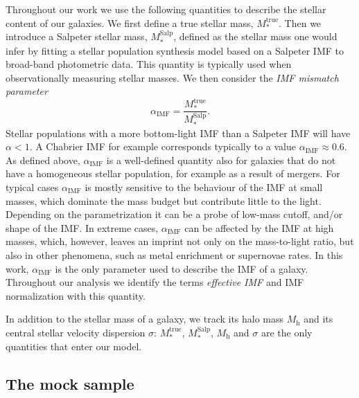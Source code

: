 \documentclass[usenatbib]{mnras}
\def\mhalo{M_{\mathrm{h}}}
\def\mtrue{M_*^{\mathrm{true}}}
\def\msalp{M_*^{\mathrm{Salp}}}
\def\aimf{\alpha_{\mathrm{IMF}}}
\begin{document}
Throughout our work we use the following quantities to describe the
stellar content of our galaxies. We first define a true stellar mass,
$\mtrue$. Then we introduce a Salpeter \citep{Sal55} stellar
mass, $\msalp$, defined as the stellar mass one would infer by fitting
a stellar population synthesis model based on a Salpeter IMF to
broad-band photometric data. This quantity is typically used when
observationally measuring stellar masses.  We then consider the {\em
  IMF mismatch parameter} \citep{Tre++10}
\begin{equation}\label{eq:aimf}
\aimf = \frac{\mtrue}{\msalp}.
\end{equation}
Stellar populations with a more bottom-light IMF than a Salpeter IMF
will have $\alpha<1$. A Chabrier IMF for example corresponds typically
to a value $\aimf\approx0.6$.  As defined above, $\aimf$ is a
well-defined quantity also for galaxies that do not have a homogeneous
stellar population, for example as a result of mergers.  For typical
cases $\aimf$ is mostly sensitive to the behaviour of the IMF at small
masses, which dominate the mass budget but contribute little to
  the light. Depending on the parametrization it can be a probe of
low-mass cutoff, and/or shape of the IMF. In
  extreme cases, $\aimf$ can be affected by the IMF at high masses,
  which, however, leaves an imprint not only on the mass-to-light
  ratio, but also in other phenomena, such as metal enrichment or
  supernovae rates. In this work, $\aimf$ is the only parameter used
to describe the IMF of a galaxy. Throughout our analysis we identify
the terms {\em effective IMF} and IMF normalization with this quantity.

In addition to the stellar mass of a galaxy, we track its halo
  mass $\mhalo$ and its central stellar velocity dispersion $\sigma$:
  $\mtrue$, $\msalp$, $\mhalo$ and $\sigma$ are the only quantities
  that enter our model.

\subsection{The mock sample}
\end{document}
